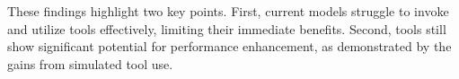These findings highlight two key points. 
First, current models struggle to invoke and utilize tools effectively, limiting their immediate benefits. 
Second, tools still show significant potential for performance enhancement, as demonstrated by the gains from simulated tool use. 

    
    


